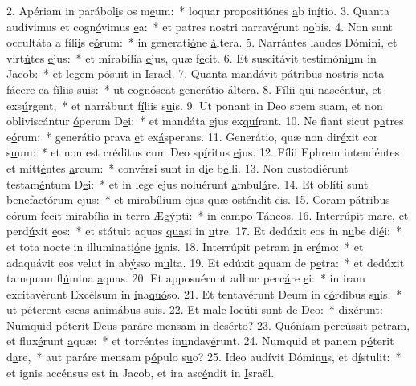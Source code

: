 2. Apériam in parábol\uline{i}s os m\uline{e}um:~* loquar propositiónes \uline{a}b in\uline{í}tio.
3. Quanta audívimus et cogn\uline{ó}vimus \uline{e}a:~* et patres nostri narrav\uline{é}runt n\uline{o}bis.
4. Non sunt occultáta a fíli\uline{i}s e\uline{ó}rum:~* in generati\uline{ó}ne \uline{á}ltera.
5. Narrántes laudes Dómini, et virt\uline{ú}tes \uline{e}jus:~* et mirabília \uline{e}jus, quæ f\uline{e}cit.
6. Et suscitávit testimóni\uline{u}m in J\uline{a}cob:~* et legem pósu\uline{i}t in \uline{I}sraël.
7. Quanta mandávit pátribus nostris nota fácere ea f\uline{í}liis s\uline{u}is:~* ut cognóscat gener\uline{á}tio \uline{á}ltera.
8. Fílii qui nascéntur, \uline{e}t exs\uline{ú}rgent,~* et narrábunt f\uline{í}liis s\uline{u}is.
9. Ut ponant in Deo spem suam, et non obliviscántur \uline{ó}perum D\uline{e}i:~* et mandáta \uline{e}jus ex\uline{quí}rant.
10. Ne fiant sicut p\uline{a}tres e\uline{ó}rum:~* generátio prava \uline{e}t ex\uline{á}sperans.
11. Generátio, quæ non dir\uline{é}xit cor s\uline{u}um:~* et non est créditus cum Deo sp\uline{í}ritus \uline{e}jus.
12. Fílii Ephrem intendéntes et mitt\uline{é}ntes \uline{a}rcum:~* convérsi sunt in d\uline{i}e b\uline{e}lli.
13. Non custodiérunt testam\uline{é}ntum D\uline{e}i:~* et in lege ejus noluérunt \uline{a}mbul\uline{á}re.
14. Et oblíti sunt benefact\uline{ó}rum \uline{e}jus:~* et mirabílium ejus quæ ost\uline{é}ndit \uline{e}is.
15. Coram pátribus eórum fecit mirabília in t\uline{e}rra Æg\uline{ý}pti:~* in c\uline{a}mpo T\uline{á}neos.
16. Interrúpit mare, et perd\uline{ú}xit \uline{e}os:~* et státuit aquas \uline{qua}si in \uline{u}tre.
17. Et dedúxit eos in n\uline{u}be di\uline{é}i:~* et tota nocte in illuminati\uline{ó}ne \uline{i}gnis.
18. Interrúpit petram \uline{i}n er\uline{é}mo:~* et adaquávit eos velut in ab\uline{ý}sso m\uline{u}lta.
19. Et edúxit \uline{a}quam de p\uline{e}tra:~* et dedúxit tamquam fl\uline{ú}mina \uline{a}quas.
20. Et apposuérunt adhuc pecc\uline{á}re \uline{e}i:~* in iram excitavérunt Excélsum in \uline{i}na\uline{quó}so.
21. Et tentavérunt Deum in c\uline{ó}rdibus s\uline{u}is,~* ut péterent escas anim\uline{á}bus s\uline{u}is.
22. Et male locúti s\uline{u}nt de D\uline{e}o:~* dixérunt: Numquid póterit Deus paráre mensam \uline{i}n des\uline{é}rto?
23. Quóniam percússit petram, et flux\uline{é}runt \uline{a}quæ:~* et torréntes in\uline{u}ndav\uline{é}runt.
24. Numquid et panem p\uline{ó}terit d\uline{a}re,~* aut paráre mensam p\uline{ó}pulo s\uline{u}o?
25. Ideo audívit Dómin\uline{u}s, et d\uline{í}stulit:~* et ignis accénsus est in Jacob, et ira asc\uline{é}ndit in \uline{I}sraël.
